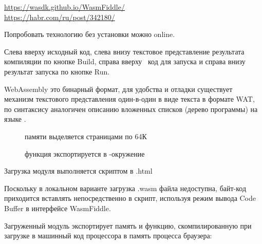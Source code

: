 
\noindent
\url{https://wasdk.github.io/WasmFiddle/}\\
\url{https://habr.com/ru/post/342180/}
\bigskip

Попробовать технологию без установки можно online.

\bigskip
{}

Слева вверху исходный код, слева внизу текстовое представление результата
компиляции по кнопке Build, справа вверху \js\ код для запуска и справа
внизу результат запуска по кнопке Run.

WebAssembly это бинарный формат, для удобства и отладки существует механизм
текстового представления один-в-один в виде текста в формате WAT, по синтаксису
аналогичен описанию вложенных списков (дерево программы) на языке \lisp.

\begin{description}
\item[] памяти выделяется страницами по 64К
\item[] функция экспортируется в
\js-окружение
\end{description}

Загрузка модуля выполняется скриптом в .html

Поскольку в локальном варианте загрузка .wasm файла недоступна, байт-код
приходится вставлять непосредственно в скрипт, используя режим вывода Code
Buffer в интерфейсе WasmFiddle.

Загруженный модуль экспортирует память и функцию, скомпилированную при загрузке
в машинный код процессора в память процесса браузера:\\
